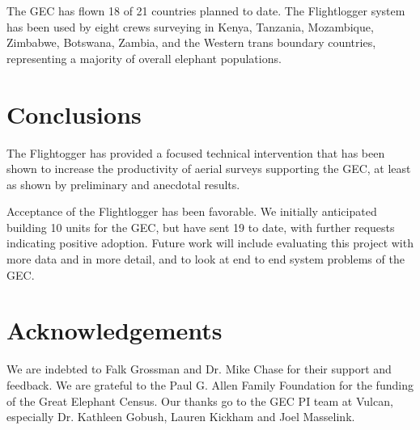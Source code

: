 \documentclass{sig-alternate-2013}
\begin{document}
The GEC has flown 18 of 21 countries planned to date. The Flightlogger system has been used by eight crews surveying in Kenya, Tanzania, Mozambique, Zimbabwe, Botswana, Zambia, and the Western trans boundary countries, representing a majority of overall elephant populations. 

\section{Conclusions}
The Flightogger has provided a focused technical intervention that has been shown to increase the productivity of aerial surveys supporting the GEC, at least as shown by preliminary and anecdotal results. 

Acceptance of the Flightlogger has been favorable. We initially anticipated building 10 units for the GEC, but have sent 19 to date, with further requests indicating positive adoption. 
Future work will include evaluating this project with more data and in more detail, and to look at end to end system problems of the GEC.

\section{Acknowledgements}
We are indebted to Falk Grossman and Dr. Mike Chase
for their support and feedback. We are grateful to the Paul G. Allen Family Foundation for the funding
of the Great Elephant Census. Our thanks go to the GEC PI team at Vulcan, especially Dr. Kathleen Gobush, Lauren Kickham and Joel Masselink.



\end{document}
